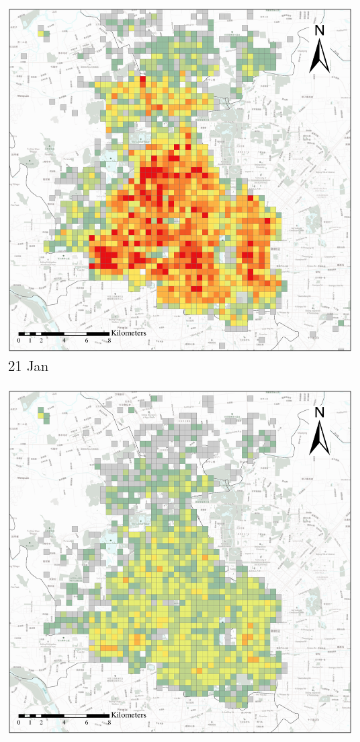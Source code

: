 \documentclass[preprints,article,accept,moreauthors,pdftex]{Definitions/mdpi}
\begin{document}
\begin{figure}[ht]
    \centering
    \begin{subfigure}{.23\textwidth}
        \includegraphics[width=\textwidth]{Figures/Overall_spatial_patterns/FN5_D2020_01_21.eps}
        \caption{21 Jan}
    \end{subfigure}
    \begin{subfigure}{.23\textwidth}
        \includegraphics[width=\textwidth]{Figures/Overall_spatial_patterns/FN5_D2020_01_25.eps}

\end{subfigure}
\end{figure}
\end{document}
